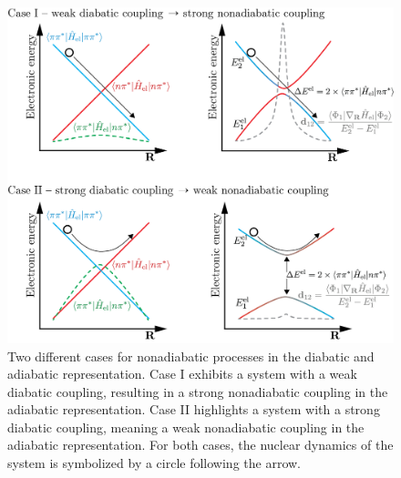 \documentclass[9pt,bestpractices]{livecoms}
\begin{document}
\begin{figure}[h]
    \centering
    \includegraphics[width=0.8\linewidth]{./figures/diabatic_adiabatic_cases.png}
    \caption{Two different cases for nonadiabatic processes in the diabatic and adiabatic representation. Case I exhibits a system with a weak diabatic coupling, resulting in a strong nonadiabatic coupling in the adiabatic representation. Case II highlights a system with a strong diabatic coupling, meaning a weak nonadiabatic coupling in the adiabatic representation. For both cases, the nuclear dynamics of the system is symbolized by a circle following the arrow.}
    \label{adiadiacases}
\end{figure}
\end{document}
